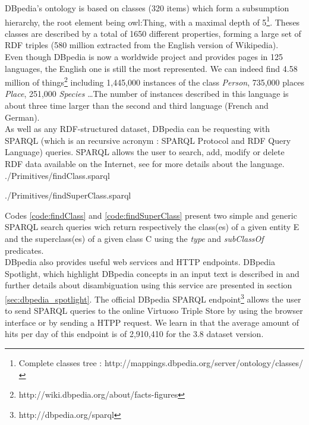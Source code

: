 DBpedia's ontology is based on classes (320 items) which form a subsumption hierarchy, the root element being owl:Thing, with a maximal depth of 5\footnote{Complete classes tree : http://mappings.dbpedia.org/server/ontology/classes/}. Theses classes are described by a total of 1650 different properties, forming a large set of RDF triples (580 million extracted from the English version of Wikipedia).\\

Even though DBpedia is now a worldwide project and provides pages in 125 languages, the English one is still the most represented. We can indeed find 4.58 million of things\footnote{http://wiki.dbpedia.org/about/facts-figures} including 1,445,000 instances of the class \textit{Person}, 735,000 places \textit{Place}, 251,000 \textit{Species} \dots The number of instances described in this language is about three time larger than the second and third language (French and German). \\

As well as any RDF-structured dataset, DBpedia can be requesting with SPARQL (which is an recursive acronym : SPARQL Protocol and RDF Query Language) queries. SPARQL allows the user to search, add, modify or delete RDF data available on the Internet, see \cite{prud2008sparql} for more details about the language. \\


	{./Primitives/findClass.sparql}


	{./Primitives/findSuperClass.sparql}

Codes \ref{code:findClass} and \ref{code:findSuperClass} present two simple and generic SPARQL search queries wich return respectively the class(es) of a given entity E and the superclass(es) of a given class C using the \textit{type} and \textit{subClassOf} predicates.\\

DBpedia also provides useful web services and HTTP endpoints. DBpedia Spotlight, which highlight DBpedia concepts in an input text is described in \cite{mendes2011dbpedia} and further details about disambiguation using this service are presented in section \ref{sec:dbpedia_spotlight}. The official DBpedia SPARQL endpoint\footnote{http://dbpedia.org/sparql} allows the user to send SPARQL queries to the online Virtuoso Triple Store by using the browser interface or by sending a HTPP request. We learn in \cite{lehmann2014dbpedia} that the average amount of hits per day of this endpoint is of 2,910,410 for the 3.8 dataset version. \\

